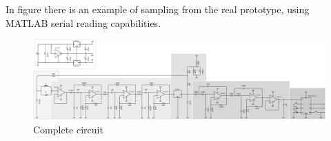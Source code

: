 In figure  there is an example of sampling from the real prototype, using MATLAB serial reading capabilities.
\begin{figure}[p]
	\centering
	\includegraphics[scale=0.25,angle=90]{ch2/img/receiver3.pdf}
	\caption{Complete circuit}
	\label{fig:completecirc}
\end{figure}